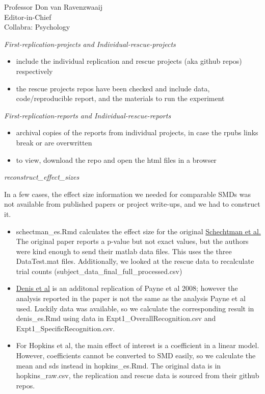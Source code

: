 \documentclass{stanfordletter}
\providecommand{\tightlist}{%
	\setlength{\itemsep}{0pt}\setlength{\parskip}{0pt}}
\begin{document}
\begin{letter}{Professor Don van Ravenzwaaij \\ Editor-in-Chief \\ Collabra: Psychology }
{			\textit{First-replication-projects and
				Individual-rescue-projects}\label{first-replication-projects-and-individual-rescue-projects}
			
			\begin{itemize}
				\tightlist
				\item
				include the individual replication and rescue projects (aka github
				repos) respectively
				\item
				the rescue projects repos have been checked and include data,
				code/reproducible report, and the materials to run the experiment
			\end{itemize}
			
			\textit{First-replication-reports and
				Individual-rescue-reports}\label{first-replication-reports-and-individual-rescue-reports}
			
			\begin{itemize}
				\tightlist
				\item
				archival copies of the reports from individual projects, in case the
				rpubs links break or are overwritten
				\item
				to view, download the repo and open the html files in a browser
			\end{itemize}
			
			\textit{reconstruct\_effect\_sizes}\label{reconstruct_effect_sizes}
			
			In a few cases, the effect size information we needed for comparable
			SMDs was not available from published papers or project write-ups, and
			we had to construct it. 
			\begin{itemize}
				\tightlist\item schectman\_es.Rmd calculates the effect size
			for the original
			\href{https://www.ncbi.nlm.nih.gov/pmc/articles/PMC6634660/}{Schechtman
				et al.} The original paper reports a p-value but not exact values, but
			the authors were kind enough to send their matlab data files. This uses
			the three DataTest.mat files. Additionally, we looked at the
				rescue data to recalculate trial counts
				(subject\_data\_final\_full\_processed.csv) 
				\item 
			\href{https://www.pnas.org/doi/pdf/10.1073/pnas.2202657119}{Denis et al}
			is an additonal replication of Payne et al 2008; however the analysis
			reported in the paper is not the same as the analysis Payne et al used.
			Luckily data was available, so we calculate the corresponding result in
			denis\_es.Rmd using data in Expt1\_OverallRecognition.csv and
			Expt1\_SpecificRecognition.csv. 
			\item  For Hopkins et al, the main effect of
			interest is a coefficient in a linear model. However, coefficients
			cannot be converted to SMD easily, so we calculate the mean and sds
			instead in hopkins\_es.Rmd. The original data is in hopkins\_raw.csv,
			the replication and rescue data is sourced from their github repos.
		\end{itemize}
		
}
\end{letter}
\end{document}
